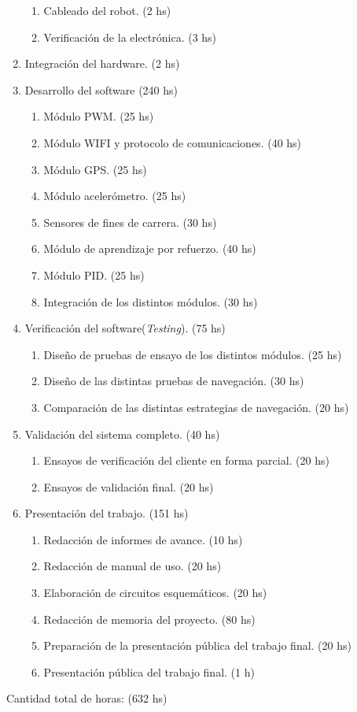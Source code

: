 \documentclass[11pt]{charter}
\begin{document}
\begin{enumerate}
\begin{enumerate}
	\item Cableado del robot. (2 hs)
	\item Verificación de la electrónica. (3 hs)
	\end{enumerate}	
\item Integración del hardware. (2 hs)	
\item Desarrollo del software (240 hs)
	\begin{enumerate}
	\item Módulo PWM. (25 hs)
	\item Módulo WIFI y protocolo de comunicaciones. (40 hs)
	\item Módulo GPS. (25 hs)
	\item Módulo acelerómetro.  (25 hs)
	\item Sensores de fines de carrera. (30 hs)
	\item Módulo de aprendizaje por refuerzo. (40 hs)
	\item Módulo PID. (25 hs)
	\item Integración de los distintos módulos. (30 hs)
	\end{enumerate}	
\item Verificación del software(\textit{Testing}). (75 hs)
	\begin{enumerate}
	\item Diseño de pruebas  de ensayo de los distintos módulos. (25 hs)
	\item Diseño de las distintas pruebas de navegación. (30 hs)
	\item Comparación de las distintas estrategias de navegación. (20 hs)
	\end{enumerate}	
\item Validación del sistema completo. (40 hs)
	\begin{enumerate}
	\item Ensayos de verificación del cliente en forma parcial. (20 hs)
	\item Ensayos de validación final. (20 hs)
	\end{enumerate}	
\item Presentación del trabajo. (151 hs)
	\begin{enumerate}
	\item Redacción de informes de avance. (10 hs)
	\item Redacción de manual de uso. (20 hs)
	\item Elaboración de circuitos esquemáticos. (20 hs)
	\item Redacción de memoria del proyecto. (80 hs)
	\item Preparación de la presentación pública del trabajo final. (20 hs)
	\item Presentación pública del trabajo final. (1 h)
	\end{enumerate}					
\end{enumerate}
Cantidad total de horas: (632 hs)
\end{document}
